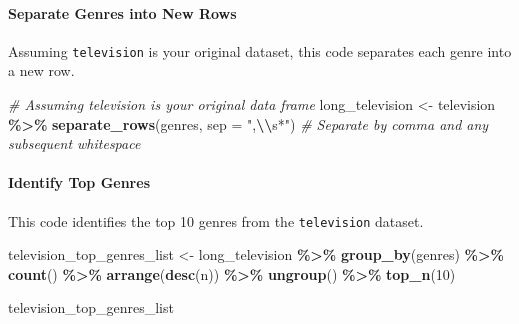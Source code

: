 \documentclass[
]{book}
\newenvironment{Shaded}{\begin{snugshade}}{\end{snugshade}}
\newcommand{\AttributeTok}[1]{\textcolor[rgb]{0.13,0.29,0.53}{#1}}
\newcommand{\CommentTok}[1]{\textcolor[rgb]{0.56,0.35,0.01}{\textit{#1}}}
\newcommand{\DecValTok}[1]{\textcolor[rgb]{0.00,0.00,0.81}{#1}}
\newcommand{\FunctionTok}[1]{\textcolor[rgb]{0.13,0.29,0.53}{\textbf{#1}}}
\newcommand{\NormalTok}[1]{#1}
\newcommand{\OtherTok}[1]{\textcolor[rgb]{0.56,0.35,0.01}{#1}}
\newcommand{\SpecialCharTok}[1]{\textcolor[rgb]{0.81,0.36,0.00}{\textbf{#1}}}
\newcommand{\StringTok}[1]{\textcolor[rgb]{0.31,0.60,0.02}{#1}}
\begin{document}
\hypertarget{separate-genres-into-new-rows}{%
\paragraph*{Separate Genres into New Rows}\label{separate-genres-into-new-rows}}

Assuming \texttt{television} is your original dataset, this code separates each genre into a new row.

\begin{Shaded}
\begin{Highlighting}[]
\CommentTok{\# Assuming \textasciigrave{}television\textasciigrave{} is your original data frame}
\NormalTok{long\_television }\OtherTok{\textless{}{-}}\NormalTok{ television }\SpecialCharTok{\%\textgreater{}\%}
  \FunctionTok{separate\_rows}\NormalTok{(genres, }\AttributeTok{sep =} \StringTok{",}\SpecialCharTok{\textbackslash{}\textbackslash{}}\StringTok{s*"}\NormalTok{)  }\CommentTok{\# Separate by comma and any subsequent whitespace}
\end{Highlighting}
\end{Shaded}

\hypertarget{identify-top-genres}{%
\paragraph*{Identify Top Genres}\label{identify-top-genres}}

This code identifies the top 10 genres from the \texttt{television} dataset.

\begin{Shaded}
\begin{Highlighting}[]
\NormalTok{television\_top\_genres\_list }\OtherTok{\textless{}{-}}\NormalTok{ long\_television }\SpecialCharTok{\%\textgreater{}\%}
  \FunctionTok{group\_by}\NormalTok{(genres) }\SpecialCharTok{\%\textgreater{}\%}
  \FunctionTok{count}\NormalTok{() }\SpecialCharTok{\%\textgreater{}\%}
  \FunctionTok{arrange}\NormalTok{(}\FunctionTok{desc}\NormalTok{(n)) }\SpecialCharTok{\%\textgreater{}\%}
  \FunctionTok{ungroup}\NormalTok{() }\SpecialCharTok{\%\textgreater{}\%}
  \FunctionTok{top\_n}\NormalTok{(}\DecValTok{10}\NormalTok{)}

\NormalTok{television\_top\_genres\_list}
\end{Highlighting}
\end{Shaded}
\end{document}

